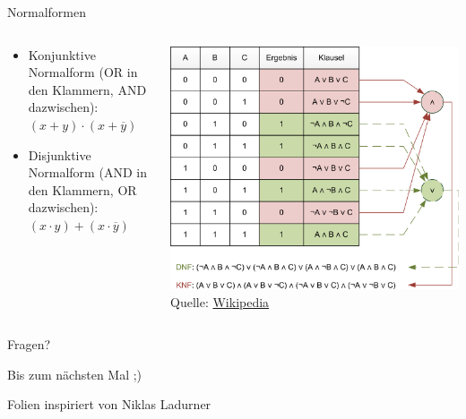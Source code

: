 \documentclass[
  german,            %
  aspectratio=169,    %
]{tumbeamer}
\begin{document}
\begin{frame}[c, fragile]{Normalformen}{}
  \begin{columns}[c]
    \begin{column}{0.5\textwidth}
      \begin{itemize}
        \item Konjunktive Normalform (OR in den Klammern, AND dazwischen): $(x+y) \cdot (x+\overline{y})$
        \item Disjunktive Normalform (AND in den Klammern, OR dazwischen): $(x\cdot y) + (x\cdot\overline{y})$
      \end{itemize}
    \end{column}
    \begin{column}{0.5\textwidth}
      \includegraphics[width=\textwidth]{w06_knf_dnf.png}
      \centering\scriptsize{Quelle: \href{https://de.wikipedia.org/wiki/Konjunktive_Normalform}{Wikipedia}}
    \end{column}
  \end{columns}
\end{frame}

\begin{frame}[c]{}{}
  \begin{center}
    \LARGE Fragen?
  \end{center}
  \vspace{0.5cm}
  \begin{center}
    \LARGE Bis zum nächsten Mal ;) \\
  \end{center}
  \vspace{1.0cm}
  \begin{center}
    \small Folien inspiriert von Niklas Ladurner
  \end{center}
\end{frame}
\end{document}
